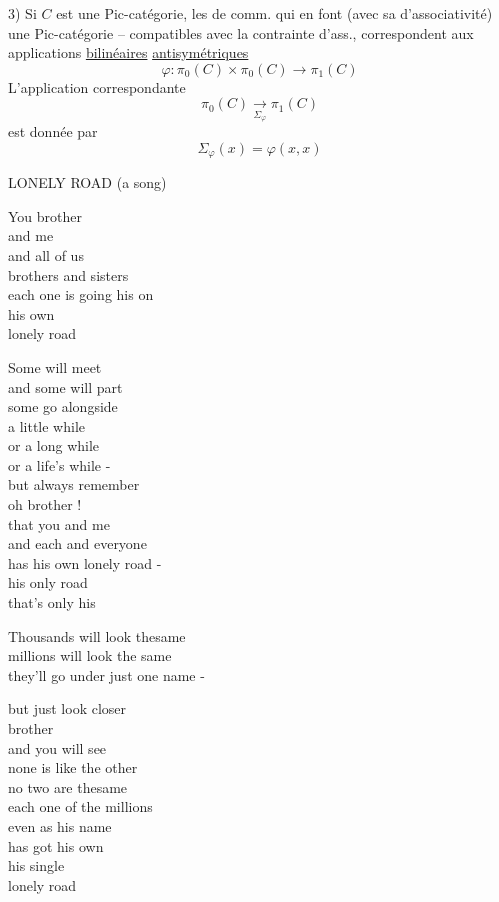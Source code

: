 3) Si $C$ est une Pic-catégorie, les   de comm. qui en font (avec sa  d'associativité) une Pic-catégorie --   compatibles avec la contrainte d'ass., correspondent aux applications \uline{bilinéaires} \uline{antisymétriques}
\[
\varphi\colon\pi_0(C)\times\pi_0(C)\longrightarrow\pi_1(C)
\]
L'application correspondante
\[
\pi_0(C)\xrightarrow[\Sigma_\varphi]{}\pi_1(C)
\]
est donnée par
\[
\Sigma_\varphi(x)=\varphi(x,x)
\]
\begin{center}
LONELY ROAD \qquad (a song)
\end{center}
\noindent\begin{minipage}[t]{.48\linewidth}\small\raggedright
You \enspace brother\\
and me\\
and all of us\\
brothers and sisters\\
each one is going his on\\
his own\\
lonely road

\medskip
Some will meet\\
and some will part\\
some go alongside\\
a little while\\
or a long while\\
or a life's while -\\
but always remember\\
oh brother !\\
that you and me\\
and each and everyone\\
has his own lonely road -\\
his only road\\
that's only his

\medskip
Thousands will look thesame\\
millions will look the same\\
they'll go under just one name -

\smallskip
but just look closer\\
brother\\
and you will see\\
none is like the other\\
no two are thesame\\
each one of the millions\\
even as his name\\
has got his own\\
his single\\
lonely road
\end{minipage}\hfill
